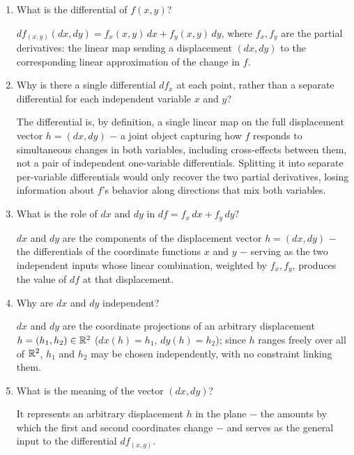 \documentclass{self-check}
\begin{document}
\begin{enumerate}[resume, leftmargin=*, itemsep=8pt]

\item What is the differential of \(f(x,y)\)?
\begin{answer}
\(df_{(x,y)}(dx,dy)=f_x(x,y)\,dx+f_y(x,y)\,dy\), where \(f_x,f_y\) are the partial derivatives: the linear map sending a displacement \((dx,dy)\) to the corresponding linear approximation of the change in \(f\).
\end{answer}

\item Why is there a single differential \(df_x\) at each point, rather than a separate differential for each independent variable \(x\) and \(y\)?
\begin{answer}
The differential is, by definition, a single linear map on the full displacement vector \(h=(dx,dy)\) \(-\) a joint object capturing how \(f\) responds to simultaneous changes in both variables, including cross-effects between them, not a pair of independent one-variable differentials. Splitting it into separate per-variable differentials would only recover the two partial derivatives, losing information about \(f\)'s behavior along directions that mix both variables.
\end{answer}

\item What is the role of \(dx\) and \(dy\) in \(df=f_x\,dx+f_y\,dy\)?
\begin{answer}
\(dx\) and \(dy\) are the components of the displacement vector \(h=(dx,dy)\) \(-\) the differentials of the coordinate functions \(x\) and \(y\) \(-\) serving as the two independent inputs whose linear combination, weighted by \(f_x,f_y\), produces the value of \(df\) at that displacement.
\end{answer}

\item Why are \(dx\) and \(dy\) independent?
\begin{answer}
\(dx\) and \(dy\) are the coordinate projections of an arbitrary displacement \(h=(h_1,h_2)\in\mathbb{R}^2\) (\(dx(h)=h_1\), \(dy(h)=h_2\)); since \(h\) ranges freely over all of \(\mathbb{R}^2\), \(h_1\) and \(h_2\) may be chosen independently, with no constraint linking them.
\end{answer}

\item What is the meaning of the vector \((dx,dy)\)?
\begin{answer}
It represents an arbitrary displacement \(h\) in the plane \(-\) the amounts by which the first and second coordinates change \(-\) and serves as the general input to the differential \(df_{(x,y)}\).
\end{answer}


\end{enumerate}
\end{document}
